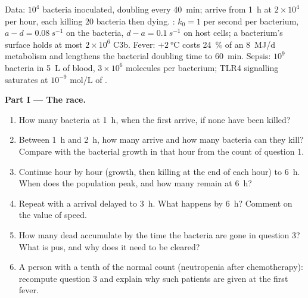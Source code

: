 \begin{problem}
\label{pb:b3:innate-immunity:1}
Data: $10^{4}$ bacteria inoculated, doubling every \qty{40}{min};
 arrive from \qty{1}{h} at $2\times 10^{4}$ per hour, each
killing $20$ bacteria then dying. : $k_{0} = 1$ per second
per bacterium, $a - d = \qty{0.08}{s^{-1}}$ on the bacteria, $d - a =
\qty{0.1}{s^{-1}}$ on host cells; a bacterium's surface holds at most
$2\times 10^{6}$ C3b. Fever: $+\qty{2}{\celsius}$ costs \qty{24}{\%} of
an \qty{8}{MJ/d} metabolism and lengthens the bacterial doubling time
to \qty{60}{min}. Sepsis: $10^{9}$ bacteria in \qty{5}{L} of blood,
$3\times 10^{6}$  molecules per bacterium; TLR4
signalling saturates at $10^{-9}$ mol/L of .

\medskip
\noindent\textbf{Part I --- The race.}
\begin{enumerate}
  \item How many bacteria at \qty{1}{h}, when the first 
        arrive, if none have been killed?
  \item Between \qty{1}{h} and \qty{2}{h}, how many  arrive
        and how many bacteria can they kill? Compare with the bacterial
        growth in that hour from the count of question 1.
  \item Continue hour by hour (growth, then killing at the end of each
        hour) to \qty{6}{h}. When does the population peak, and how many
        remain at \qty{6}{h}?
  \item Repeat with a  arrival delayed to \qty{3}{h}. What
        happens by \qty{6}{h}? Comment on the value of speed.
  \item How many dead  accumulate by the time the bacteria
        are gone in question 3? What is pus, and why does it need to be
        cleared?
  \item A person with a tenth of the normal  count
        (neutropenia after chemotherapy): recompute question 3 and
        explain why such patients are given  at the first
        fever.
\end{enumerate}


\end{problem}
